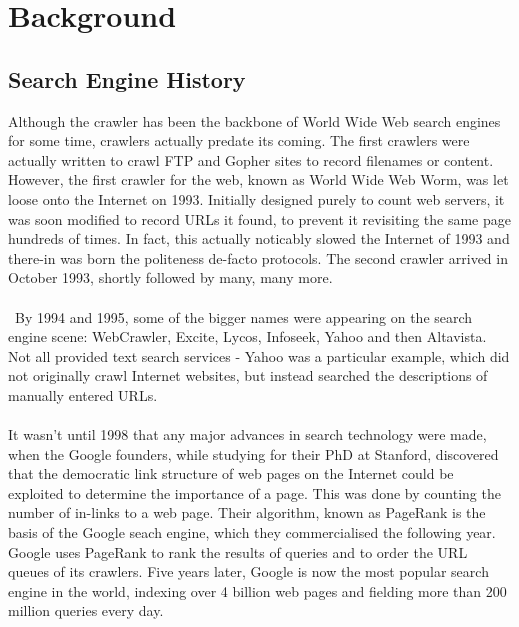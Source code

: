 \chapter{Background}
\section{Search Engine History}
Although the crawler has been the backbone of World Wide Web search engines for some time, crawlers actually predate its coming. The first crawlers were actually written to crawl FTP and Gopher sites to record filenames or content. However, the first crawler for the web, known as World Wide Web Worm\cite{ref18}, was let loose onto the Internet on 1993. Initially designed purely to count web servers, it was soon modified to record URLs it found, to prevent it revisiting the same page hundreds of times. In fact, this actually noticably slowed the Internet of 1993 and there-in was born the politeness de-facto protocols. The second crawler arrived in October 1993, shortly followed by many, many more.\\
\\ \
By 1994 and 1995, some of the bigger names were appearing on the search engine scene: WebCrawler, Excite, Lycos, Infoseek, Yahoo and then Altavista. Not all provided text search services - Yahoo was a particular example, which did not originally crawl Internet websites, but instead searched the descriptions of manually entered URLs.\\
\ \\
It wasn't until 1998 that any major advances in search technology were made, when the Google founders, while studying for their PhD at Stanford, discovered that the democratic link structure of web pages on the Internet could be exploited to determine the importance of a page. This was done by counting the number of in-links to a web page. Their algorithm, known as PageRank\cite{Lawrence981} is the basis of the Google seach engine\cite{ref7}, which they commercialised the following year. Google uses PageRank to rank the results of queries\cite{ref7} and to order the URL queues of its crawlers\cite{ref5}. Five years later, Google is now the most popular search engine in the world, indexing over 4 billion web pages\cite{site6} and fielding more than 200 million queries every day\cite{site7}.

